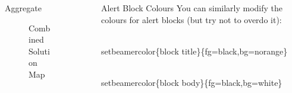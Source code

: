 \documentclass[final]{beamer}
\newlength{\sepwid}
\newlength{\introcolwid}
\newlength{\datacolwid}
\begin{document}
\begin{frame}[t]
\begin{columns}[t]
\begin{column}{\introcolwid}
\begin{block}{Aggregate}
\begin{figure}
				\caption{Combined Solution Map}
			\end{figure}
          \end{block}
	\end{column}
	\begin{column}{\sepwid}\end{column}			%
	\begin{column}{\datacolwid}
      \begin{alertblock}{Alert Block Colours}
        You can similarly modify the colours for alert blocks (but try not to overdo it):\\
        \begin{semiverbatim}
          {\color{red}\\setbeamercolor}\{block title\}\newline \{fg=black,bg=norange\}
        \end{semiverbatim}
        \begin{semiverbatim}
          {\color{red}\\setbeamercolor}\{block  body\}\newline \{fg=black,bg=white\}
        \end{semiverbatim}
      \end{alertblock}        
    \end{column}
	\begin{column}{\sepwid}\end{column}			%
\end{columns}
\end{frame}
\end{document}
